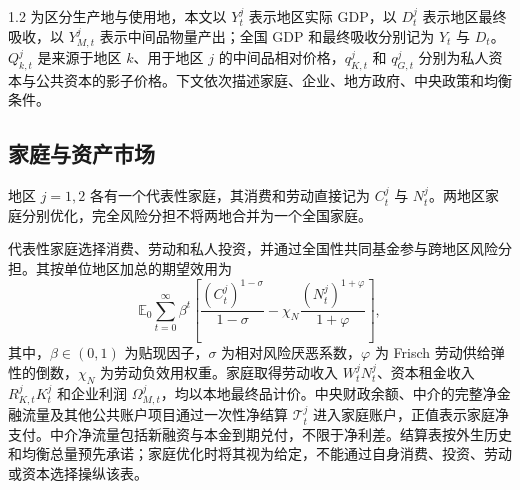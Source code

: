 \documentclass[12pt,UTF8]{ctexart}
\newcommand{\E}{\mathbb{E}}
\begin{document}
\begin{spacing}{1.2}
		为区分生产地与使用地，本文以 $Y_t^j$ 表示地区实际 GDP，以 $D_t^j$ 表示地区最终吸收，以 $Y_{M,t}^j$ 表示中间品物量产出；全国 GDP 和最终吸收分别记为 $Y_t$ 与 $D_t$。$Q_{k,t}^j$ 是来源于地区 $k$、用于地区 $j$ 的中间品相对价格，$q_{K,t}^j$ 和 $q_{G,t}^j$ 分别为私人资本与公共资本的影子价格。下文依次描述家庭、企业、地方政府、中央政策和均衡条件。
		
		\subsection{家庭与资产市场}
		
		地区 $j=1,2$ 各有一个代表性家庭，其消费和劳动直接记为 $C_t^j$ 与 $N_t^j$。两地区家庭分别优化，完全风险分担不将两地合并为一个全国家庭。

		代表性家庭选择消费、劳动和私人投资，并通过全国性共同基金参与跨地区风险分担。其按单位地区加总的期望效用为
		\begin{equation}
			\E_0\sum_{t=0}^{\infty}\beta^t
			\left[
			\frac{(C_{t}^j)^{1-\sigma}}{1-\sigma}
			-\chi_N\frac{(N_{t}^j)^{1+\varphi}}{1+\varphi}
			\right],
		\end{equation}
		其中，$\beta\in(0,1)$ 为贴现因子，$\sigma$ 为相对风险厌恶系数，$\varphi$ 为 Frisch 劳动供给弹性的倒数，$\chi_N$ 为劳动负效用权重。家庭取得劳动收入 $W_t^jN_t^j$、资本租金收入 $R_{K,t}^jK_t^j$ 和企业利润 $\Omega_{M,t}^j$，均以本地最终品计价。中央财政余额、中介的完整净金融流量及其他公共账户项目通过一次性净结算 $\mathcal T_t^j$ 进入家庭账户，正值表示家庭净支付。中介净流量包括新融资与本金到期兑付，不限于净利差。结算表按外生历史和均衡总量预先承诺；家庭优化时将其视为给定，不能通过自身消费、投资、劳动或资本选择操纵该表。


\end{spacing}
\end{document}
